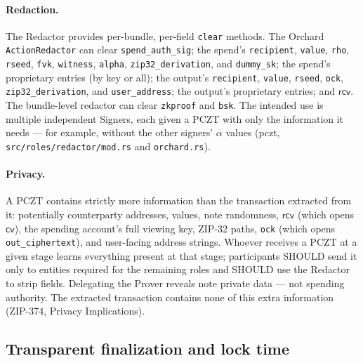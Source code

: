 \documentclass[11pt,a4paper]{article}
\theoremstyle{definition}
\newcommand{\cvsym}{\mathsf{cv}}
\newcommand{\rcv}{\ensuremath{\mathsf{rcv}}}
\begin{document}
\paragraph{Redaction.} The Redactor provides per-bundle, per-field
\texttt{clear} methods. The Orchard \texttt{ActionRedactor} can clear
\texttt{spend\_auth\_sig}; the spend's \texttt{recipient},
\texttt{value}, \texttt{rho}, \texttt{rseed}, \texttt{fvk},
\texttt{witness}, \texttt{alpha}, \texttt{zip32\_derivation}, and
\texttt{dummy\_sk}; the spend's proprietary entries (by key or all); the
output's \texttt{recipient}, \texttt{value}, \texttt{rseed},
\texttt{ock}, \texttt{zip32\_derivation}, and \texttt{user\_address};
the output's proprietary entries; and $\rcv$. The bundle-level redactor
can clear \texttt{zkproof} and \texttt{bsk}. The intended use is multiple
independent Signers, each given a PCZT with only the information it needs
--- for example, without the other signers' $\alpha$ values
(\textsf{pczt}, \texttt{src/roles/redactor/mod.rs} and
\texttt{orchard.rs}).

\paragraph{Privacy.} A PCZT contains strictly more information than the
transaction extracted from it: potentially counterparty addresses,
values, note randomness, $\rcv$ (which opens $\cvsym$), the spending
account's full viewing key, ZIP-32 paths, \texttt{ock} (which opens
\texttt{out\_ciphertext}), and user-facing address strings. Whoever
receives a PCZT at a given stage learns everything present at that stage;
participants SHOULD send it only to entities required for the remaining
roles and SHOULD use the Redactor to strip fields. Delegating the Prover
reveals note private data --- not spending authority. The extracted
transaction contains none of this extra information (ZIP-374, Privacy
Implications).

\subsection{Transparent finalization and lock time}\label{sec:pczt-final}
\end{document}
